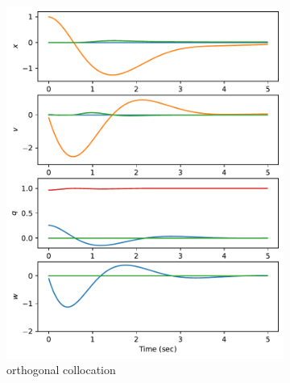 \documentclass[]{article}
\begin{document}
\begin{figure}[H]
\begin{subfigure}[b]{0.3\textwidth}
		\includegraphics[width=\textwidth]{figures/statey115dx1.pdf}
		\caption{orthogonal collocation}
	\end{subfigure}%
	\begin{subfigure}[b]{0.3\textwidth}
		\centering

\end{subfigure}
\end{figure}
\end{document}
